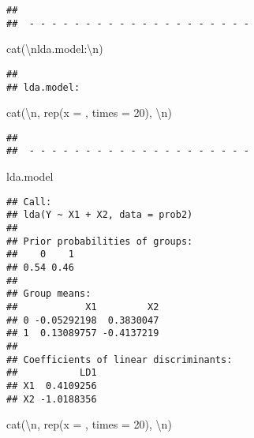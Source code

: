 \documentclass[
]{article}
\newenvironment{Shaded}{\begin{snugshade}}{\end{snugshade}}
\newcommand{\AttributeTok}[1]{\textcolor[rgb]{0.77,0.63,0.00}{#1}}
\newcommand{\DecValTok}[1]{\textcolor[rgb]{0.00,0.00,0.81}{#1}}
\newcommand{\FunctionTok}[1]{\textcolor[rgb]{0.00,0.00,0.00}{#1}}
\newcommand{\NormalTok}[1]{#1}
\newcommand{\SpecialCharTok}[1]{\textcolor[rgb]{0.00,0.00,0.00}{#1}}
\newcommand{\StringTok}[1]{\textcolor[rgb]{0.31,0.60,0.02}{#1}}
\begin{document}
\begin{verbatim}
## 
##  - - - - - - - - - - - - - - - - - - - -
\end{verbatim}

\begin{Shaded}
\begin{Highlighting}[]
\FunctionTok{cat}\NormalTok{(}\StringTok{\textquotesingle{}}\SpecialCharTok{\textbackslash{}n}\StringTok{lda.model:}\SpecialCharTok{\textbackslash{}n}\StringTok{\textquotesingle{}}\NormalTok{)}
\end{Highlighting}
\end{Shaded}

\begin{verbatim}
## 
## lda.model:
\end{verbatim}

\begin{Shaded}
\begin{Highlighting}[]
\FunctionTok{cat}\NormalTok{(}\StringTok{\textquotesingle{}}\SpecialCharTok{\textbackslash{}n}\StringTok{\textquotesingle{}}\NormalTok{, }\FunctionTok{rep}\NormalTok{(}\AttributeTok{x =} \StringTok{\textquotesingle{}{-}\textquotesingle{}}\NormalTok{, }\AttributeTok{times =} \DecValTok{20}\NormalTok{), }\StringTok{\textquotesingle{}}\SpecialCharTok{\textbackslash{}n}\StringTok{\textquotesingle{}}\NormalTok{)}
\end{Highlighting}
\end{Shaded}

\begin{verbatim}
## 
##  - - - - - - - - - - - - - - - - - - - -
\end{verbatim}

\begin{Shaded}
\begin{Highlighting}[]
\NormalTok{lda.model}
\end{Highlighting}
\end{Shaded}

\begin{verbatim}
## Call:
## lda(Y ~ X1 + X2, data = prob2)
## 
## Prior probabilities of groups:
##    0    1 
## 0.54 0.46 
## 
## Group means:
##            X1         X2
## 0 -0.05292198  0.3830047
## 1  0.13089757 -0.4137219
## 
## Coefficients of linear discriminants:
##           LD1
## X1  0.4109256
## X2 -1.0188356
\end{verbatim}

\begin{Shaded}
\begin{Highlighting}[]
\FunctionTok{cat}\NormalTok{(}\StringTok{\textquotesingle{}}\SpecialCharTok{\textbackslash{}n}\StringTok{\textquotesingle{}}\NormalTok{, }\FunctionTok{rep}\NormalTok{(}\AttributeTok{x =} \StringTok{\textquotesingle{}{-}\textquotesingle{}}\NormalTok{, }\AttributeTok{times =} \DecValTok{20}\NormalTok{), }\StringTok{\textquotesingle{}}\SpecialCharTok{\textbackslash{}n}\StringTok{\textquotesingle{}}\NormalTok{)}
\end{Highlighting}
\end{Shaded}
\end{document}
